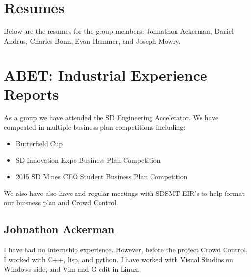 


\section{Resumes}


Below are the resumes for the group members: Johnathon Ackerman, Daniel Andrus, Charles Bonn, Evan Hammer, and Joseph Mowry.









%     
%     
%     

\section{ABET:  Industrial Experience Reports}

As a group we have attended the  SD Engineering Accelerator. We have compeated in multiple business plan competitions including:
	\begin{itemize}
	\item{Butterfield Cup}
	\item{SD Innovation Expo Business Plan Competition}
	\item{2015 SD Mines CEO Student Business Plan Competition}
	\end{itemize}
We also have also have and regular meetings with SDSMT EIR's to help format our buisness plan and Crowd Control.

\subsection{Johnathon Ackerman}

 I have had no Internship experience. However, before the project Crowd Control, I worked with C++, lisp, and python. I have worked with Visual Studios on Windows side, and Vim and G edit in Linux. 

